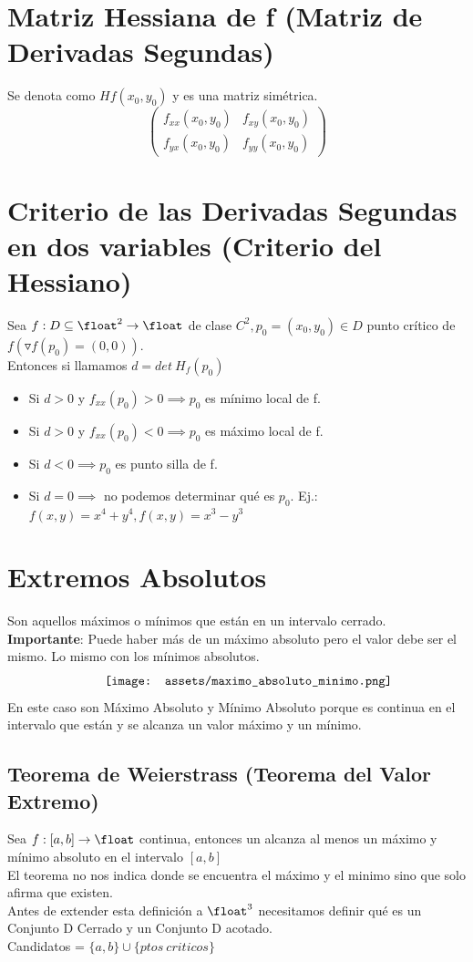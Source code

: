 \documentclass[10pt,a4paper]{article}
\begin{document}
\section*{Matriz Hessiana de f (Matriz de Derivadas Segundas)}
Se denota como $Hf(x_{0}, y_{0})$ y es una matriz simétrica.
\[
\begin{pmatrix}
f_{xx}(x_{0}, y_{0}) & f_{xy}(x_{0}, y_{0}) \\
f_{yx}(x_{0}, y_{0}) & f_{yy}(x_{0}, y_{0})
\end{pmatrix}
\]
\section*{Criterio de las Derivadas Segundas en dos variables (Criterio del Hessiano)}
Sea $f:D \subseteq \float^{2} \rightarrow \float$ de clase $C^{2}, p_{0} = (x_{0}, y_{0}) \in D$ punto crítico de $f(\triangledown f(p_{0}) = (0,0))$. \\
Entonces si llamamos $d = det \ H_{f}(p_{0})$
\begin{itemize}
    \item Si $d>0$ y $f_{xx}(p_{0}) > 0 \implies p_{0}$ es mínimo local de f.
    \item Si $d>0$ y $f_{xx}(p_{0}) < 0 \implies p_{0}$ es máximo local de f.
    \item Si $d<0 \implies p_{0}$ es punto silla de f.
    \item Si $d=0 \implies$ no podemos determinar qué es $p_{0}$. Ej.: $f(x,y) = x^{4} + y^{4}, f(x,y) = x^{3}-y^{3}$
\end{itemize}
\section*{Extremos Absolutos}
Son aquellos máximos o mínimos que están en un intervalo cerrado. \\
\textbf{Importante}: Puede haber más de un máximo absoluto pero el valor debe ser el mismo. Lo mismo con los mínimos absolutos. \\
\[\begin{minipage}[b]{0.6\textwidth}
    \texttt{[image: assets/maximo\_absoluto\_minimo.png]}
\end{minipage}\]
En este caso son Máximo Absoluto y Mínimo Absoluto porque es continua en el intervalo que están y se alcanza un valor máximo y un mínimo. 
\subsection*{Teorema de Weierstrass (Teorema del Valor Extremo)}
Sea $f:[a, b] \rightarrow \float$ continua, entonces un alcanza al menos un máximo y mínimo absoluto en el intervalo $[a, b]$ \\
El teorema no nos indica donde se encuentra el máximo y el minimo sino que solo afirma que existen. \\
Antes de extender esta definición a $\float^{3}$ necesitamos definir qué es un Conjunto D Cerrado y un Conjunto D acotado. \\
Candidatos = $\{a, b\} \cup \{ptos \ criticos\}$
\end{document}
